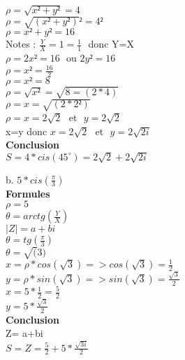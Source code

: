 $\rho = \sqrt{x²+y²} = 4$\\
$\rho = \sqrt{(x²+y²)}² = 4²$\\
$\rho = x²+y² = 16$\\

Notes : $\frac{Y}{X} = 1 = \frac{1}{1}$ $ $ donc Y=X \\

$\rho = 2x² = 16$ $ $ ou $ 2y² = 16$ \\
$\rho = x² = \frac{16}{2}$ \\
$\rho = x² = 8$ \\
$\rho = \sqrt{x²} = \sqrt{8 = (2*4)}$ \\
$\rho = x = \sqrt{(2*2²)}$ \\
$\rho = x = 2\sqrt{2}$ $ $ et $ $ $ y=2\sqrt{2} $\\

x=y donc $x = 2\sqrt{2}$ $ $ et $ $ $ y=2\sqrt{2i} $ \\

\textbf{Conclusion}\\

$ S= 4 * cis(45^{\circ}) = 2\sqrt{2} + 2\sqrt{2i}$

\newpage

b. $5 * cis(\frac{\pi}{3})$ \\

\textbf{Formules} \\

$\rho = 5 $\\
$\theta = arctg(\frac{Y}{X})$ \\
$|Z| = a+bi $\\

\vspace{3mm} %
$\theta = tg(\frac{\pi}{3})$\\
$\theta = \sqrt(3)$\\

$x= \rho * cos(\sqrt{3}) => cos(\sqrt{3}) = \frac{1}{2}$ \\
$y= \rho * sin(\sqrt{3}) => sin(\sqrt{3}) = \frac{\sqrt{3}}{2}$ \\

$x= 5*\frac{1}{2} = \frac{5}{2}$ \\
$y= 5*\frac{\sqrt{3}}{2}$ \\

\textbf{Conclusion} \\

Z= a+bi \\

$ S= Z=\frac{5}{2} + 5*\frac{\sqrt{3i}} {2}$

